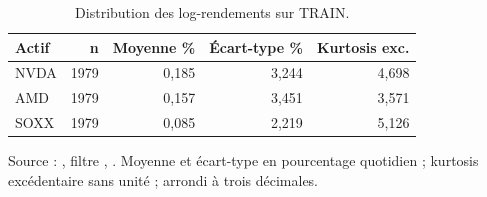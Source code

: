 \begin{table}[!htbp]
\centering
\caption{Distribution des log-rendements sur TRAIN.}
\label{tab:descriptive}
\small
\setlength{\tabcolsep}{4pt}
\renewcommand{\arraystretch}{1.16}
\begin{tabularx}{\linewidth}{Xrrrr}
\toprule
\textbf{Actif} & \textbf{n} & \textbf{Moyenne \%} & \textbf{Écart-type \%} & \textbf{Kurtosis exc.} \\
\midrule
NVDA & 1979 & 0,185 & 3,244 & 4,698 \\
AMD & 1979 & 0,157 & 3,451 & 3,571 \\
SOXX & 1979 & 0,085 & 2,219 & 5,126 \\
\bottomrule
\end{tabularx}
\par\smallskip
\begin{minipage}{\linewidth}\footnotesize Source : , filtre , . Moyenne et écart-type en pourcentage quotidien ; kurtosis excédentaire sans unité ; arrondi à trois décimales.
\end{minipage}
\end{table}
